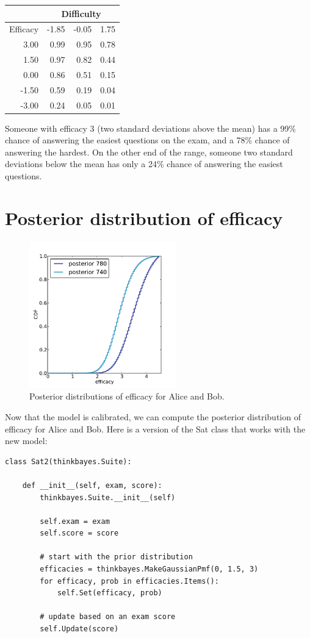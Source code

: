 \documentclass[12pt]{book}
\begin{document}
\begin{tabular}{|r|r|r|r|}
\hline
           & \multicolumn{3}{|c|}{Difficulty} \\
\hline
Efficacy   & -1.85   &   -0.05   &      1.75  \\
\hline
3.00 &  0.99 &  0.95 &  0.78   \\
1.50 &  0.97 &  0.82 &  0.44   \\
0.00 &  0.86 &  0.51 &  0.15   \\
-1.50 &  0.59 &  0.19 &  0.04   \\
-3.00 &  0.24 &  0.05 &  0.01   \\
\hline
\end{tabular}

Someone with efficacy 3 (two standard deviations above
the mean) has a 99\% chance of answering the easiest questions on
the exam, and a 78\% chance of answering the hardest.  On the other
end of the range, someone two standard deviations below the mean
has only a 24\% chance of answering the easiest questions.


\section{Posterior distribution of efficacy}

\begin{figure}
\centerline{\includegraphics[height=2.5in]{figs/sat_posteriors_eff.pdf}}
\caption{Posterior distributions of efficacy for Alice and Bob.}
\label{fig.satposterior2}
\end{figure}

Now that the model is calibrated, we can compute the posterior
distribution of efficacy for Alice and Bob.  Here is a version of the
Sat class that works with the new model:

\begin{verbatim}
class Sat2(thinkbayes.Suite):

    def __init__(self, exam, score):
        thinkbayes.Suite.__init__(self)

        self.exam = exam
        self.score = score

        # start with the prior distribution
        efficacies = thinkbayes.MakeGaussianPmf(0, 1.5, 3)
        for efficacy, prob in efficacies.Items():
            self.Set(efficacy, prob)

        # update based on an exam score
        self.Update(score)
\end{verbatim}
\end{document}
